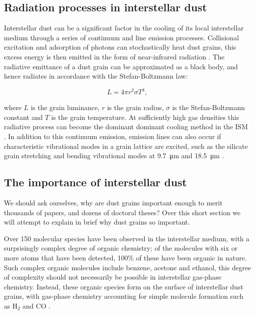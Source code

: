 \subsection{Radiation processes in interstellar dust}
\label{sec:dustcooling-background}

Interstellar dust can be a significant factor in the cooling of its local interstellar medium through a series of continuum and line emission processes.
Collisional excitation and adsorption of photons can stochastically heat dust grains, this excess energy is then emitted in the form of near-infrared radiation \parencite{dwekCoolingSputteringInfrared1996}.
The radiative emittance of a dust grain can be approximated as a black body, and hence radiates in accordance with the Stefan-Boltzmann law:

\begin{equation}
  L = 4\pi r^2 \sigma T^4 , 
\end{equation}

\noindent
where $L$ is the grain luminance, $r$ is the grain radius, $\sigma$ is the Stefan-Boltzmann constant and $T$ is the grain temperature.
At sufficiently high gas densities this radiative process can become the dominant dominant cooling method in the ISM \parencite{wolfireNeutralAtomicPhases1995}.
In addition to this continuum emission, emission lines can also occur if characteristic vibrational modes in a grain lattice are excited, such as the silicate grain stretching and bending vibrational modes at \SI{9.7}{\micro\metre} and \SI{18.5}{\micro\metre} \parencite[212]{whittetDustGalacticEnvironment2002}.


\subsection{The importance of interstellar dust}
\label{sec:dustimportance}

We should ask ourselves, why are dust grains important enough to merit thousands of papers, and dozens of doctoral theses?
Over this short section we will attempt to explain in brief why dust grains so important.


Over 150 molecular species have been observed in the interstellar medium, with a surprisingly complex degree of organic chemistry; of the molecules with six or more atoms that have been detected, 100\% of these have been organic in nature.
Such complex organic molecules include benzene, acetone and ethanol, this degree of complexity should not necessarily be possible in interstellar gas-phase chemistry.
Instead, these organic species form on the surface of interstellar dust grains, with gas-phase chemistry accounting for simple molecule formation such as $\text{H}_2$ and $\text{CO}$
\parencite{herbstComplexOrganicInterstellar2009}.

